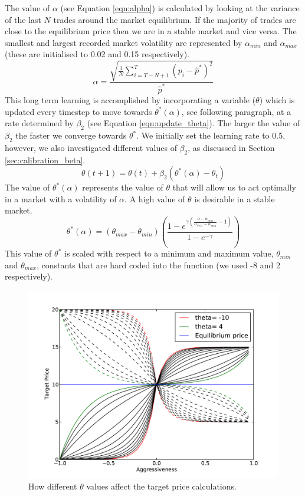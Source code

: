 \documentclass[preprint]{acm_proc_article-sp} %
\begin{document}
The  value of $\alpha$ (see Equation \ref{eqn:alpha}) is calculated by looking
at the variance of the last $N$ trades around the market equilibrium.  If the
majority of trades are close to the equilibrium price then we are in a stable
market and vice versa. The smallest and largest recorded market volatility are
represented by $\alpha_{min}$ and $\alpha_{max}$ (these are initialised to 0.02
and 0.15 respectively).
\begin{equation}
  \alpha = \frac{\sqrt{\frac 1 N \sum^T_{i=T-N+1}(p_i-\hat p^*)^2}}{\hat p^*}
  \label{eqn:alpha}
\end{equation}
This long term learning is accomplished by incorporating a variable ($\theta$)
which is updated every timestep to move towards $\theta^*(\alpha)$, see
following paragraph, at a rate
determined by $\beta_2$ (see Equation \ref{eqn:update_theta}).  The larger the
value of $\beta_2$ the faster we converge towards $\theta^*$. We initially set
the learning rate to 0.5, however, we also investigated different values of
$\beta_2$, as discussed in Section \ref{sec:calibration_beta}.
\begin{equation}
  \theta(t+1)=\theta(t)+\beta_2(\theta^*(\alpha)-\theta_t)
  \label{eqn:update_theta}
\end{equation}
The value of $\theta^*(\alpha)$ represents the value of $\theta$ that will
allow us to act optimally in a market with a volatility of $\alpha$. A high
value of $\theta$ is desirable in a stable market.
\begin{equation}
  \theta^*(\alpha) = (\theta_{max}-\theta_{min})
  \left(\frac{1-e^{\gamma\left(\frac{\alpha-\alpha_{min}}{\alpha_{max}
  -\alpha_{min}}-1\right)}}{1-e^{-\gamma}}\right)
  \label{thetastar}
\end{equation}
This value of $\theta^*$ is scaled with respect to a minimum and maximum value,
$\theta_{min}$ and $\theta_{max}$, constants that are hard coded into the
function (we used -8 and 2 respectively).

\begin{figure}[H]
  \centering
  \includegraphics[width=\columnwidth]{graphs_and_stats/graph_thetas.pdf}
  \caption{How different $\theta$ values affect the target price calculations.}
  \label{fig:theta}
\end{figure}
\end{document}

